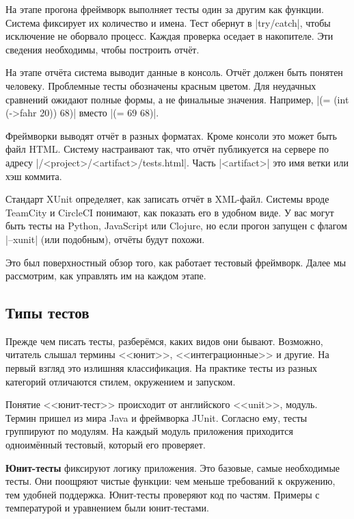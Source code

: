 На этапе прогона фреймворк выполняет тесты один за другим как функции. Система
фиксирует их количество и имена. Тест обернут в \spverb|try/catch|, чтобы
исключение не оборвало процесс. Каждая проверка оседает в накопителе. Эти
сведения необходимы, чтобы построить отч\"{е}т.

На этапе отч\"{е}та система выводит данные в консоль. Отч\"{е}т должен быть понятен
человеку. Проблемные тесты обозначены красным цветом. Для неудачных сравнений
ожидают полные формы, а не финальные значения. Например,
\spverb|(= (int (->fahr 20)) 68)| вместо \spverb|(= 69 68)|.

Фреймворки выводят отч\"{е}т в разных форматах. Кроме консоли это может быть файл
HTML. Систему настраивают так, что отч\"{е}т публикуется на сервере по адресу
\spverb|/<project>/<artifact>/tests.html|. Часть \spverb|<artifact>| это имя
ветки или хэш коммита.

Стандарт XUnit определяет, как записать отч\"{е}т в XML-файл. Системы вроде TeamCity
и CircleCI понимают, как показать его в удобном виде. У вас могут быть тесты на
Python, JavaScript или Clojure, но если прогон запущен с флагом \spverb|--xunit|
(или подобным), отч\"{е}ты будут похожи.

Это был поверхностный обзор того, как работает тестовый фреймворк. Далее мы
рассмотрим, как управлять им на каждом этапе.

\subsection{Типы тестов}


Прежде чем писать тесты, разбер\"{е}мся, каких видов они бывают. Возможно, читатель
слышал термины <<юнит>>, <<интеграционные>> и другие. На первый взгляд это
излишняя классификация. На практике тесты из разных категорий отличаются стилем,
окружением и запуском.

Понятие <<юнит-тест>> происходит от английского <<unit>>, модуль. Термин пришел
из мира Java и фреймворка JUnit. Согласно ему, тесты группируют по модулям. На
каждый модуль приложения приходится одноим\"{е}нный тестовый, который его проверяет.

\textbf{Юнит-тесты} фиксируют логику приложения. Это базовые, самые необходимые
тесты. Они поощряют чистые функции: чем меньше требований к окружению, тем
удобней поддержка. Юнит-тесты проверяют код по частям. Примеры с температурой и
уравнением были юнит-тестами.

